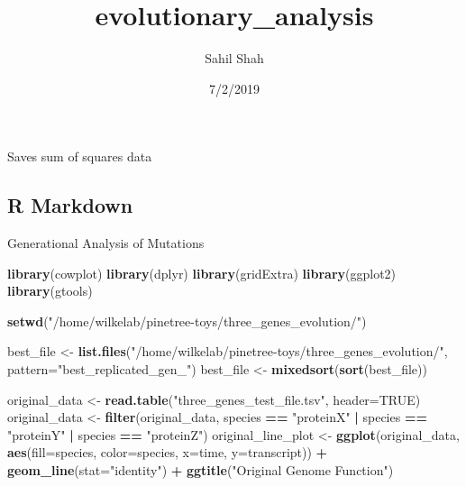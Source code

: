 \documentclass[]{article}
\title{evolutionary\_analysis}
\author{Sahil Shah}
\date{7/2/2019}
\newenvironment{Shaded}{\begin{snugshade}}{\end{snugshade}}
\newcommand{\DataTypeTok}[1]{\textcolor[rgb]{0.13,0.29,0.53}{#1}}
\newcommand{\KeywordTok}[1]{\textcolor[rgb]{0.13,0.29,0.53}{\textbf{#1}}}
\newcommand{\NormalTok}[1]{#1}
\newcommand{\OperatorTok}[1]{\textcolor[rgb]{0.81,0.36,0.00}{\textbf{#1}}}
\newcommand{\OtherTok}[1]{\textcolor[rgb]{0.56,0.35,0.01}{#1}}
\newcommand{\StringTok}[1]{\textcolor[rgb]{0.31,0.60,0.02}{#1}}
\begin{document}
\maketitle

Saves sum of squares data

\hypertarget{r-markdown}{%
\subsection{R Markdown}\label{r-markdown}}

Generational Analysis of Mutations

\begin{Shaded}
\begin{Highlighting}[]
\KeywordTok{library}\NormalTok{(cowplot)}
\KeywordTok{library}\NormalTok{(dplyr)}
\KeywordTok{library}\NormalTok{(gridExtra)}
\KeywordTok{library}\NormalTok{(ggplot2)}
\KeywordTok{library}\NormalTok{(gtools)}

\KeywordTok{setwd}\NormalTok{(}\StringTok{"/home/wilkelab/pinetree-toys/three_genes_evolution/"}\NormalTok{)}

\NormalTok{best_file <-}\StringTok{ }\KeywordTok{list.files}\NormalTok{(}\StringTok{"/home/wilkelab/pinetree-toys/three_genes_evolution/"}\NormalTok{, }\DataTypeTok{pattern=}\StringTok{"best_replicated_gen_"}\NormalTok{)}
\NormalTok{best_file <-}\StringTok{ }\KeywordTok{mixedsort}\NormalTok{(}\KeywordTok{sort}\NormalTok{(best_file))}

\NormalTok{original_data <-}\StringTok{ }\KeywordTok{read.table}\NormalTok{(}\StringTok{"three_genes_test_file.tsv"}\NormalTok{, }\DataTypeTok{header=}\OtherTok{TRUE}\NormalTok{)}
\NormalTok{original_data <-}\StringTok{ }\KeywordTok{filter}\NormalTok{(original_data, species }\OperatorTok{==}\StringTok{ "proteinX"} \OperatorTok{|}\StringTok{ }\NormalTok{species }\OperatorTok{==}\StringTok{ "proteinY"} \OperatorTok{|}\StringTok{ }\NormalTok{species }\OperatorTok{==}\StringTok{ "proteinZ"}\NormalTok{)}
\NormalTok{original_line_plot <-}\StringTok{  }\KeywordTok{ggplot}\NormalTok{(original_data, }\KeywordTok{aes}\NormalTok{(}\DataTypeTok{fill=}\NormalTok{species, }\DataTypeTok{color=}\NormalTok{species, }\DataTypeTok{x=}\NormalTok{time, }\DataTypeTok{y=}\NormalTok{transcript)) }\OperatorTok{+}\StringTok{ }\KeywordTok{geom_line}\NormalTok{(}\DataTypeTok{stat=}\StringTok{"identity"}\NormalTok{) }\OperatorTok{+}\StringTok{ }\KeywordTok{ggtitle}\NormalTok{(}\StringTok{"Original Genome Function"}\NormalTok{)}


\end{Highlighting}
\end{Shaded}
\end{document}
